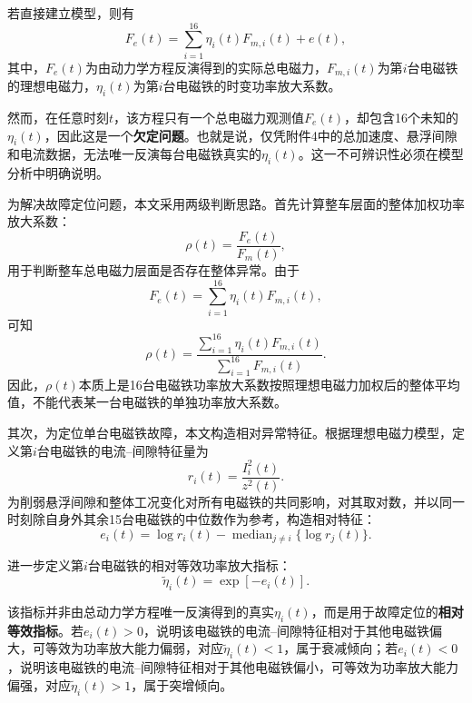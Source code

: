 \documentclass[a4paper]{nmmcm}
\begin{document}
若直接建立模型，则有
\begin{equation}
F_e(t)=\sum_{i=1}^{16}\eta_i(t)F_{m,i}(t)+e(t),
\end{equation}
其中，$F_e(t)$为由动力学方程反演得到的实际总电磁力，$F_{m,i}(t)$为第$i$台电磁铁的理想电磁力，$\eta_i(t)$为第$i$台电磁铁的时变功率放大系数。

然而，在任意时刻$t$，该方程只有一个总电磁力观测值$F_e(t)$，却包含16个未知的$\eta_i(t)$，因此这是一个\textbf{欠定问题}。也就是说，仅凭附件4中的总加速度、悬浮间隙和电流数据，无法唯一反演每台电磁铁真实的$\eta_i(t)$。这一不可辨识性必须在模型分析中明确说明。

为解决故障定位问题，本文采用两级判断思路。首先计算整车层面的整体加权功率放大系数：
\begin{equation}
\rho(t)=\frac{F_e(t)}{F_m(t)},
\end{equation}
用于判断整车总电磁力层面是否存在整体异常。由于
\begin{equation}
F_e(t)=\sum_{i=1}^{16}\eta_i(t)F_{m,i}(t),
\end{equation}
可知
\begin{equation}
\rho(t)=
\frac{\sum_{i=1}^{16}\eta_i(t)F_{m,i}(t)}
{\sum_{i=1}^{16}F_{m,i}(t)}.
\end{equation}
因此，$\rho(t)$本质上是16台电磁铁功率放大系数按照理想电磁力加权后的整体平均值，不能代表某一台电磁铁的单独功率放大系数。

其次，为定位单台电磁铁故障，本文构造相对异常特征。根据理想电磁力模型，定义第$i$台电磁铁的电流--间隙特征量为
\begin{equation}
r_i(t)=\frac{I_i^2(t)}{z^2(t)}.
\end{equation}
为削弱悬浮间隙和整体工况变化对所有电磁铁的共同影响，对其取对数，并以同一时刻除自身外其余15台电磁铁的中位数作为参考，构造相对特征：
\begin{equation}
e_i(t)=\log r_i(t)-\operatorname{median}_{j\neq i}\{\log r_j(t)\}.
\end{equation}

进一步定义第$i$台电磁铁的相对等效功率放大指标：
\begin{equation}
\tilde{\eta}_i(t)=\exp[-e_i(t)].
\end{equation}

该指标并非由总动力学方程唯一反演得到的真实$\eta_i(t)$，而是用于故障定位的\textbf{相对等效指标}。若$e_i(t)>0$，说明该电磁铁的电流--间隙特征相对于其他电磁铁偏大，可等效为功率放大能力偏弱，对应$\tilde{\eta}_i(t)<1$，属于衰减倾向；若$e_i(t)<0$，说明该电磁铁的电流--间隙特征相对于其他电磁铁偏小，可等效为功率放大能力偏强，对应$\tilde{\eta}_i(t)>1$，属于突增倾向。
\end{document}
